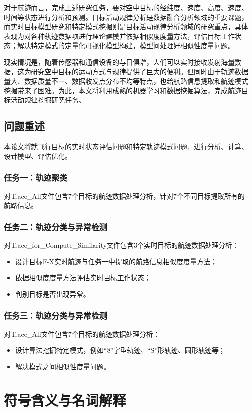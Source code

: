 \documentclass[GBK]{ctexart}
\begin{document}
\begin{spacing}{1.5}
对于航迹而言，完成上述研究任务，要对空中目标的经纬度、速度、高度、速度、时间等状态进行分析和预测。目标活动规律分析是数据融合分析领域的重要课题，而实时目标模型研究和特定模式挖掘则是目标活动规律分析领域的研究重点，具体表现为对各种轨迹数据项进行理论建模并依据相似度度量方法，评估目标工作状态；解决特定模式的定量化可视化模型构建，模型间处理好相似性度量问题。

现实情况是，随着传感器和通信设备的与日俱增，人们可以实时接收发射海量数据，这为研究空中目标的运动方式与规律提供了巨大的便利。但同时由于轨迹数据量大、数据质量不一、数据收发点分布不均等特点，也给航路信息提取和航迹模式挖掘带来了困难。为此，本文将利用成熟的机器学习和数据挖掘算法，完成航迹目标活动规律挖掘研究任务。

\subsection{问题重述}
本论文将就飞行目标的实时状态评估问题和特定轨迹模式问题，进行分析、计算、设计模型、评估优化。

\subsubsection{任务一：轨迹聚类}
对Trace\_All文件包含7个目标的航迹数据处理分析，针对7个不同目标提取所有的航路信息。%
\subsubsection{任务二：轨迹分类与异常检测}
对Trace\_for\_Compute\_Similarity文件包含3个实时目标的航迹数据处理分析：
\begin{itemize}
  \item 设计目标F-X实时航迹与任务一中提取的航路信息相似度度量方法；
  \item 依据相似度度量方法评估实时目标工作状态；
  \item 判别目标是否出现异常。
\end{itemize}
\subsubsection{任务三：轨迹分类与异常检测}
对Trace\_All文件包含7个目标的航迹数据处理分析：
\begin{itemize}
  \item 设计算法挖掘特定模式，例如“8”字型轨迹、“S”形轨迹、圆形轨迹等；
  \item 解决模式之间相似性度量问题。
\end{itemize}
\section{符号含义与名词解释}

\end{spacing}
\end{document}
